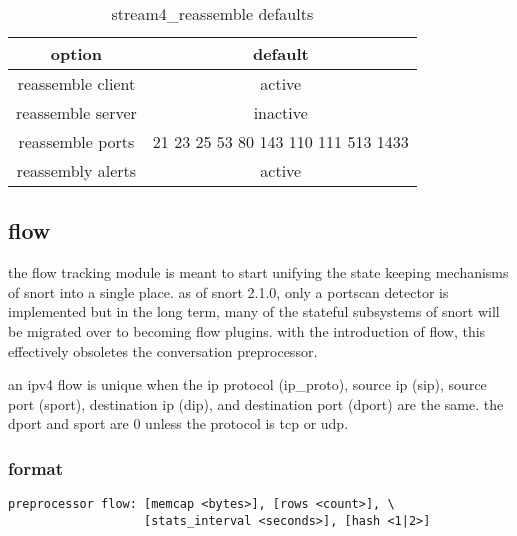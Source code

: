 \documentclass[english]{report}
\begin{document}
%
\begin{table}[!hbpt]

\caption{stream4\_reassemble defaults\label{stream4 reassemble defaults}}

\begin{center}\begin{tabular}{|c|c|}
\hline 
option&
default\\
\hline
\hline 
reassemble client&
active\\
\hline 
reassemble server&
inactive\\
\hline 
reassemble ports&
21 23 25 53 80 143 110 111 513 1433\\
\hline 
reassembly alerts&
active\\
\hline
\end{tabular}\end{center}
\end{table}


\subsection{flow\label{sub:flow}}

the flow tracking module is meant to start unifying the state keeping
mechanisms of snort into a single place. as of snort 2.1.0, only a portscan
detector is implemented but in the long term,  many of the stateful subsystems
of snort will be migrated over to becoming flow plugins. with the introduction
of flow, this effectively obsoletes the conversation preprocessor.

an ipv4 flow is unique when the ip protocol (ip\_proto), source ip (sip),
source port (sport), destination ip (dip), and destination port (dport) are the
same.  the dport and sport are 0 unless the protocol is tcp or udp.

\subsubsection{format}
\begin{verbatim}
preprocessor flow: [memcap <bytes>], [rows <count>], \
                   [stats_interval <seconds>], [hash <1|2>]
\end{verbatim}
\end{document}

